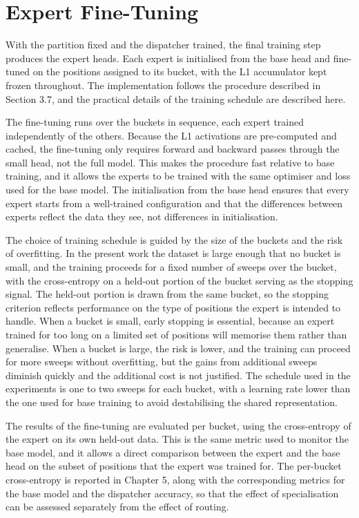 \section{Expert Fine-Tuning}

With the partition fixed and the dispatcher trained, the final training step produces the expert heads. Each expert is initialised from the base head and fine-tuned on the positions assigned to its bucket, with the L1 accumulator kept frozen throughout. The implementation follows the procedure described in Section 3.7, and the practical details of the training schedule are described here.

The fine-tuning runs over the buckets in sequence, each expert trained independently of the others. Because the L1 activations are pre-computed and cached, the fine-tuning only requires forward and backward passes through the small head, not the full model. This makes the procedure fast relative to base training, and it allows the experts to be trained with the same optimiser and loss used for the base model. The initialisation from the base head ensures that every expert starts from a well-trained configuration and that the differences between experts reflect the data they see, not differences in initialisation.

The choice of training schedule is guided by the size of the buckets and the risk of overfitting. In the present work the dataset is large enough that no bucket is small, and the training proceeds for a fixed number of sweeps over the bucket, with the cross-entropy on a held-out portion of the bucket serving as the stopping signal. The held-out portion is drawn from the same bucket, so the stopping criterion reflects performance on the type of positions the expert is intended to handle. When a bucket is small, early stopping is essential, because an expert trained for too long on a limited set of positions will memorise them rather than generalise. When a bucket is large, the risk is lower, and the training can proceed for more sweeps without overfitting, but the gains from additional sweeps diminish quickly and the additional cost is not justified. The schedule used in the experiments is one to two sweeps for each bucket, with a learning rate lower than the one used for base training to avoid destabilising the shared representation.

The results of the fine-tuning are evaluated per bucket, using the cross-entropy of the expert on its own held-out data. This is the same metric used to monitor the base model, and it allows a direct comparison between the expert and the base head on the subset of positions that the expert was trained for. The per-bucket cross-entropy is reported in Chapter 5, along with the corresponding metrics for the base model and the dispatcher accuracy, so that the effect of specialisation can be assessed separately from the effect of routing.

